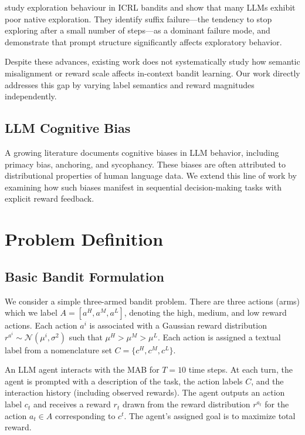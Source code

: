 \documentclass{article} %
\begin{document}
\citet{krishna_icl} study exploration behaviour in ICRL bandits and show that many LLMs exhibit poor native exploration. They identify suffix failure—the tendency to stop exploring after a small number of steps—as a dominant failure mode, and demonstrate that prompt structure significantly affects exploratory behavior.

Despite these advances, existing work does not systematically study how semantic misalignment or reward scale affects in-context bandit learning. Our work directly addresses this gap by varying label semantics and reward magnitudes independently.

\subsection*{LLM Cognitive Bias}
A growing literature \citep{echterhoff-etal-2024-cognitive, Casper2023OpenPA} documents cognitive biases in LLM behavior, including primacy bias, anchoring, and sycophancy. These biases are often attributed to distributional properties of human language data. We extend this line of work by examining how such biases manifest in sequential decision-making tasks with explicit reward feedback.


\section{Problem Definition}

\subsection*{Basic Bandit Formulation}
We consider a simple three-armed bandit problem. There are three actions (arms) which we label $ A = [a^{H}, a^{M}, a^{L}]$, denoting the high, medium, and low reward actions. Each action $a^i$ is associated with a Gaussian reward distribution $r^{a^i} \sim \mathcal{N}(\mu^i, \sigma^2)$ such that $\mu^{H} > \mu^{M} > \mu^{L}$. Each action is assigned a textual label from a nomenclature set $C = \{c^H, c^M, c^L\}$. 

An LLM agent interacts with the MAB for $T=10$ time steps. At each turn, the agent is prompted with a description of the task, the action labels $C$, and the interaction history (including observed rewards). The agent outputs an action label $c_t$ and receives a reward $r_t$ drawn from the reward distribution $r^{a_t}$ for the action $a_t \in A$ corresponding to $c^t$. The agent's assigned goal is to maximize total reward.  
\end{document}
